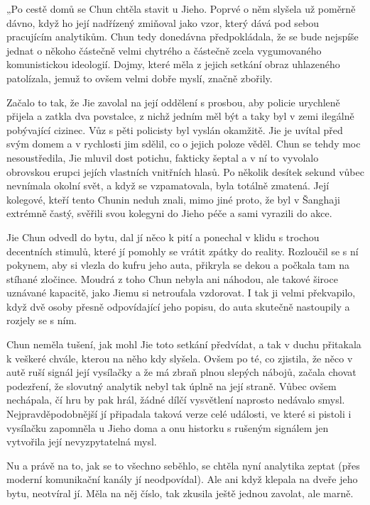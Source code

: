 „Po cestě domů se Chun chtěla stavit u Jieho. Poprvé o něm slyšela už poměrně dávno, když ho její nadřízený zmiňoval jako vzor, který dává pod sebou pracujícím analytikům. Chun tedy donedávna předpokládala, že se bude nejspíše jednat o někoho částečně velmi chytrého a částečně zcela vygumovaného komunistickou ideologií. Dojmy, které měla z jejich setkání obraz uhlazeného patolízala, jemuž to ovšem velmi dobře myslí, značně zbořily.

 Začalo to tak, že Jie zavolal na její oddělení s prosbou, aby policie urychleně přijela a zatkla dva povstalce, z nichž jedním měl být a taky byl v zemi ilegálně pobývající cizinec. Vůz s pěti policisty byl vyslán okamžitě. Jie je uvítal před svým domem a v rychlosti jim sdělil, co o jejich poloze věděl. Chun se tehdy moc nesoustředila, Jie mluvil dost potichu, fakticky šeptal a v ní to vyvolalo obrovskou erupci jejích vlastních vnitřních hlasů. Po několik desítek sekund vůbec nevnímala okolní svět, a když se vzpamatovala, byla totálně zmatená. Její kolegové, kteří tento Chunin neduh znali, mimo jiné proto, že byl v Šanghaji extrémně častý, svěřili svou kolegyni do Jieho péče a sami vyrazili do akce.
 
Jie Chun odvedl do bytu, dal jí něco k pití a ponechal v klidu s trochou decentních stimulů, které jí pomohly se vrátit zpátky do reality. Rozloučil se s ní pokynem, aby si vlezla do kufru jeho auta, přikryla se dekou a počkala tam na stíhané zločince. Moudrá z toho Chun nebyla ani náhodou, ale takové široce uznávané kapacitě, jako Jiemu si netroufala vzdorovat. I tak ji velmi překvapilo, když dvě osoby přesně odpovídající jeho popisu, do auta skutečně nastoupily a rozjely se s ním.

Chun neměla tušení, jak mohl Jie toto setkání předvídat, a tak v duchu přitakala k veškeré chvále, kterou na něho kdy slyšela. Ovšem po té, co zjistila, že něco v autě ruší signál její vysílačky a že má zbraň plnou slepých nábojů, začala chovat podezření, že slovutný analytik nebyl tak úplně na její straně. Vůbec ovšem nechápala, čí hru by pak hrál, žádné dílčí vysvětlení naprosto nedávalo smysl. Nejpravděpodobnější jí připadala taková verze celé události, ve které si pistoli i vysílačku zapomněla u Jieho doma a onu historku s rušeným signálem jen vytvořila její nevyzpytatelná mysl. 

Nu a právě na to, jak se to všechno seběhlo, se chtěla nyní analytika zeptat (přes moderní komunikační kanály jí neodpovídal). Ale ani když klepala na dveře jeho bytu, neotvíral jí. Měla na něj číslo, tak zkusila ještě jednou zavolat, ale marně.
\vspace{0.75cm}

